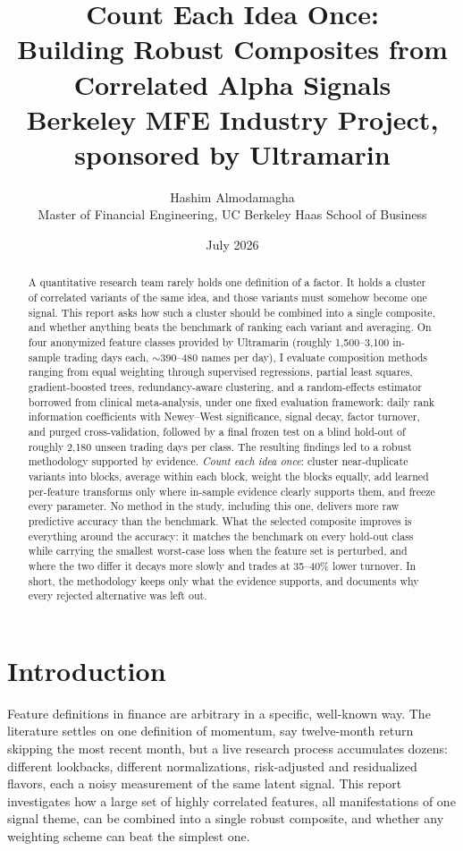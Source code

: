 \documentclass[11pt]{article}
\title{\textbf{Count Each Idea Once:\\ Building Robust Composites from\\ Correlated Alpha Signals}\\[1.2ex]
\large Berkeley MFE Industry Project, sponsored by Ultramarin}
\author{Hashim Almodamagha\\ \small Master of Financial Engineering, UC Berkeley Haas School of Business}
\date{July 2026}
\begin{document}
\maketitle

\begin{abstract}
\noindent
A quantitative research team rarely holds one definition of a factor. It holds a cluster of
correlated variants of the same idea, and those variants must somehow become one signal.
This report asks how such a cluster should be combined into a single composite, and whether
anything beats the benchmark of ranking each variant and averaging. On four anonymized
feature classes provided by Ultramarin (roughly 1{,}500--3{,}100 in-sample trading days
each, $\sim$390--480 names per day), I evaluate composition methods ranging from equal
weighting through supervised regressions, partial least squares, gradient-boosted trees,
redundancy-aware clustering, and a random-effects estimator borrowed from clinical
meta-analysis, under one fixed evaluation framework: daily rank information coefficients
with Newey--West significance, signal decay, factor turnover, and purged
cross-validation, followed by a final frozen test on a blind hold-out of roughly
2{,}180 unseen trading days per class. The resulting findings led to a robust
methodology supported by evidence. \emph{Count each idea once}: cluster near-duplicate variants into
blocks, average within each block, weight the blocks equally, add learned per-feature
transforms only where in-sample evidence clearly supports them, and freeze every parameter.
No method in the study, including this one, delivers more raw predictive accuracy than the
benchmark. What the selected composite improves is everything around the accuracy: it
matches the benchmark on every hold-out class while carrying the smallest worst-case loss
when the feature set is perturbed, and where the two differ it decays more slowly and trades
at 35--40\% lower turnover. In short, the methodology keeps only what the evidence supports, and documents why
every rejected alternative was left out.
\end{abstract}

\clearpage

\section{Introduction}
\label{sec:intro}

Feature definitions in finance are arbitrary in a specific, well-known way. The literature
settles on one definition of momentum, say twelve-month return skipping the most recent month,
but a live research process accumulates dozens: different lookbacks, different normalizations,
risk-adjusted and residualized flavors, each a noisy measurement of the same latent signal.
This report investigates how a large set of highly correlated features, all manifestations of
one signal theme, can be combined into a single robust composite, and whether any weighting
scheme can beat the simplest one.
\end{document}
